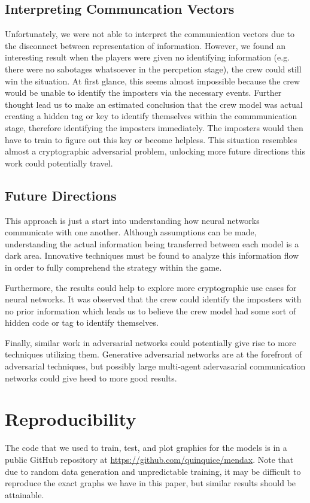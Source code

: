 \documentclass[10pt,twocolumn,letterpaper]{article}
\begin{document}
\subsection{Interpreting Communcation Vectors}
Unfortunately, we were not able to interpret the communication vectors due to the
disconnect between representation of information. However, we found an 
interesting result when the players were given no identifying information (e.g. 
there were no sabotages whatsoever in the percpetion stage), the crew could still
win the situation. At first glance, this seems almost impossible because the crew would
be unable to identify the imposters via the necessary events. Further thought lead us
to make an estimated conclusion that the crew model was actual creating a hidden tag or key
to identify themselves within the commmunication stage, therefore identifying the imposters 
immediately. The imposters would then have to train to figure out this key or
become helpless. This situation resembles almost a cryptographic adversarial problem,
unlocking more future directions this work could potentially travel.
\subsection{Future Directions}
This approach is just a start into understanding how neural networks
communicate with one another. Although assumptions can be made,
understanding the actual information being transferred between each model is
a dark area. Innovative techniques must be found to analyze this information flow 
in order to fully comprehend the strategy within the game.

Furthermore, the results could help to explore more cryptographic use cases for neural networks.
It was observed that the crew could identify the imposters with no prior information which leads us to
believe the crew model had some sort of hidden code or tag to identify themselves.

Finally, similar work in adversarial networks could potentially give rise to
more techniques utilizing them. Generative adversarial networks are at the forefront of adversarial techniques, but possibly
large multi-agent adervasarial communication networks could give heed to more good results.
{\small


}
\appendix
\section{Reproducibility}
The code that we used to train, test, and plot graphics for the models
is in a public GitHub repository at \url{https://github.com/quinquice/mendax}.
Note that due to random data generation and unpredictable training, it may be
difficult to reproduce the exact graphs we have in this paper, but similar results
should be attainable.
\end{document}

